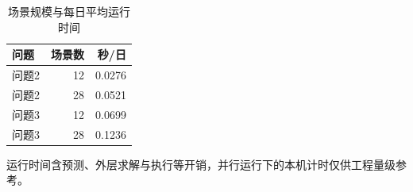 \begin{table}[htbp]\centering\small
\caption{场景规模与每日平均运行时间}
\label{tab:v2_solve_times}
\begin{tabularx}{\linewidth}{LRR}\toprule
问题 & 场景数 & 秒/日\\\midrule
问题2 & 12 & 0.0276\\
问题2 & 28 & 0.0521\\
问题3 & 12 & 0.0699\\
问题3 & 28 & 0.1236\\
\bottomrule\end{tabularx}
\par\smallskip\parbox{\linewidth}{\footnotesize 运行时间含预测、外层求解与执行等开销，并行运行下的本机计时仅供工程量级参考。}
\end{table}